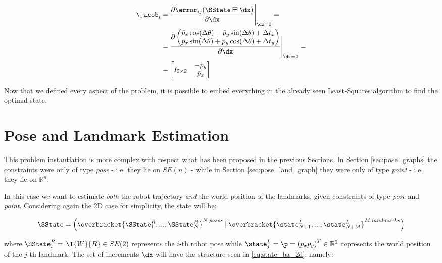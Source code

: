 \begin{align}
    \jacob_i &= \frac{\partial \error_{ij}(\SState \boxplus \dx)}{\partial \dx} \Bigg \rvert_{\dx = 0} = \nonumber \\
    &= \frac{\partial\begin{pmatrix}
            \tilde{p}_x\cos(\Delta\theta) - \tilde{p}_y\sin(\Delta\theta) + \Delta t_x \\
            \tilde{p}_x\sin(\Delta\theta) + \tilde{p}_y\cos(\Delta\theta) + \Delta t_y
        \end{pmatrix}}{\partial\dx} \Bigg \rvert_{\dx = 0} = \nonumber \\
    &= \begin{bmatrix}
            I_{2 \times 2} & \begin{matrix} -\tilde{p}_y \\ \tilde{p}_x\end{matrix}
    \end{bmatrix}
    \label{eq:jacobian_r2}
\end{align}

Now that we defined every aspect of the problem, it is possible to embed everything in the already seen Least-Squares algorithm to find the optimal state.

\section{Pose and Landmark Estimation}\label{sec:landmark_full_SLAM}
This problem instantiation is more complex with respect what has been proposed in the previous Sections. In Section \ref{sec:pose_graphs} the constraints were only of type \textit{pose} - i.e. they lie on $SE(n)$ - while in Section \ref{sec:pose_land_graph} they were only of type \textit{point} - i.e. they lie on $\mathbb{R}^n$.

In this case we want to estimate \textit{both} the robot trajectory \textit{and} the world position of the landmarks, given constraints of type \textit{pose} and \textit{point}. Considering again the 2D case for simplicity, the state will be:

\begin{equation}
    \SState = \left(\overbracket{\SState^R_1, ..., \SState^R_N}^{N \;poses}\: |\: \overbracket{\state^L_{N+1}, ..., \state^L_{N+M}}^{M \;landmarks}\right)
    \label{eq:state_ba_2d}
\end{equation}

\noindent where $\SState^R_i = \,\T{W}{R} \in SE(2)$ represents the $i$-th robot pose while $\state^L_j = \p = \left(p_x p_y\right)^T \in \mathbb{R}^2$ represents the world position of the $j$-th landmark. The set of increments $\dx$ will have the structure seen in \ref{eq:state_ba_2d}, namely:

